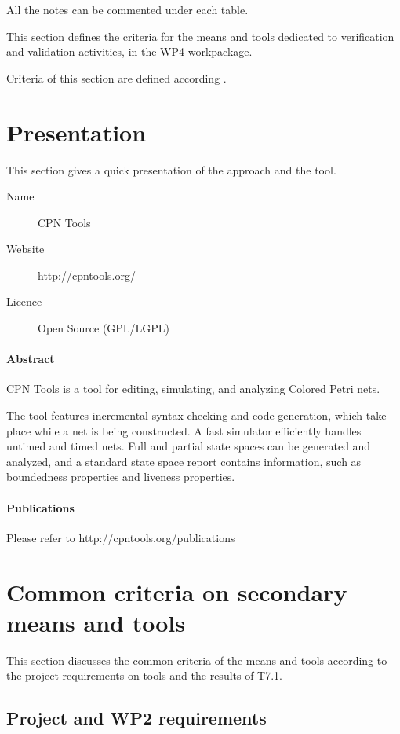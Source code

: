 All the notes can be commented under each table.

This section defines the criteria for the means and tools dedicated to verification and validation activities, in the WP4 workpackage. 

Criteria of this section are defined according \citep{D4.1}.

\section{Presentation}

This section gives a quick presentation of the approach and the tool.

\begin{description}
\item[Name] CPN Tools
\item[Website] http://cpntools.org/
\item[Licence] Open Source (GPL/LGPL)
\end{description}

\paragraph{Abstract} CPN Tools is a tool for editing, simulating, and analyzing Colored Petri nets.

The tool features incremental syntax checking and code generation, which take place while a net is being constructed. A fast simulator efficiently handles untimed and timed nets. Full and partial state spaces can be generated and analyzed, and a standard state space report contains information, such as boundedness properties and liveness properties.

\paragraph{Publications} Please refer to http://cpntools.org/publications


\section{Common criteria on secondary means and tools}
\label{common}
This section discusses the common criteria of the means and tools according to the project requirements on tools and the results of T7.1.

\subsection{Project and WP2 requirements}


